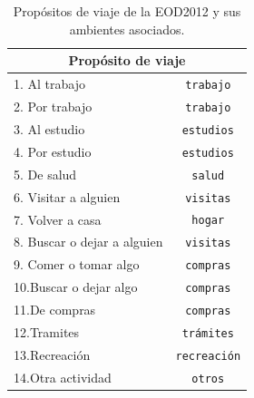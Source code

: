 \begin{table}[h!]
\centering
\begin{tabular}{||l|c||} 
 \hline
 \multicolumn{2}{||c||}{\textbf{Propósito de viaje}} \\
 \hline
1. Al trabajo               & \texttt{trabajo}      \\
2. Por trabajo              & \texttt{trabajo}      \\
3. Al estudio               & \texttt{estudios}     \\
4. Por estudio              & \texttt{estudios}     \\
5. De salud                 & \texttt{salud}        \\
6. Visitar a alguien        & \texttt{visitas}      \\
7. Volver a casa            & \texttt{hogar}        \\
8. Buscar o dejar a alguien & \texttt{visitas}      \\
9. Comer o tomar algo       & \texttt{compras}      \\
10.Buscar o dejar algo      & \texttt{compras}      \\
11.De compras               & \texttt{compras}      \\
12.Tramites                 & \texttt{trámites}     \\
13.Recreación               & \texttt{recreación}   \\
14.Otra actividad           & \texttt{otros}        \\
 \hline
\end{tabular}
\caption{Propósitos de viaje de la EOD2012 y sus ambientes asociados.}
\label{table:ambientes-prop-full}
\end{table}

